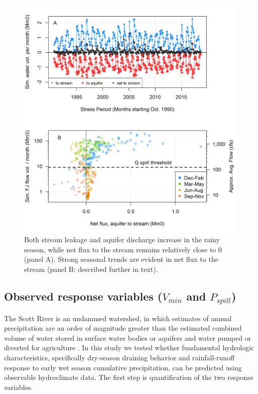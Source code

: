 \documentclass[hess, manuscript]{copernicus}
\begin{document}
\begin{figure}
\includegraphics[width=1\linewidth]{f03} \caption{\label{fig:flow_to_aq_and_stream} Both stream leakage and aquifer discharge increase in the rainy season, while net flux to the stream remains relatively close to 0 (panel A). Strong seasonal trends are evident in net flux to the stream (panel B; described further in text).}\label{fig:flow_to_aq_and_stream}
\end{figure}

\subsection{\texorpdfstring{Observed response variables (\(V_{min}\) and
\(P_{spill}\))}{Observed response variables (V\_\{min\} and P\_\{spill\})}}

The Scott River is an undammed watershed, in which estimates of annual
precipitation are an order of magnitude greater than the estimated
combined volume of water stored in surface water bodies or aquifers and
water pumped or diverted for agriculture \citep{Tolley2019}. In this
study we tested whether fundamental hydrologic characteristics,
specifically dry-season draining behavior and rainfall-runoff response
to early wet season cumulative precipitation, can be predicted using
observable hydroclimate data. The first step is quantification of the
two response variables.
\end{document}
